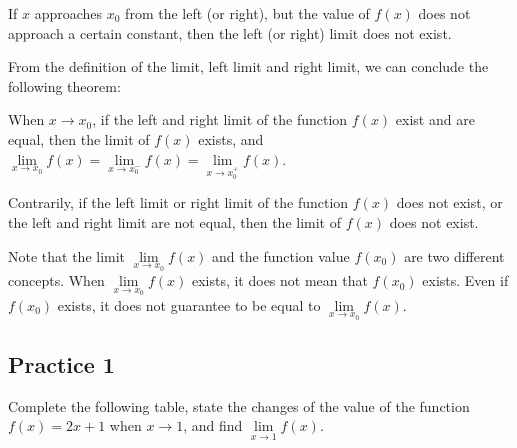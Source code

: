 \documentclass[12pt]{report}
\begin{document}
If $x$ approaches $x_0$ from the left (or right), but the value of $f (x)$ does
not approach a certain constant, then the left (or right) limit does not exist.

From the definition of the limit, left limit and right limit, we can conclude
the following theorem:
\begin{mdframed}[style=MyFrame]
    When $x \to x_0$, if the left and right limit of the function $f (x)$ exist and are equal, then the limit of $f (x)$ exists, and $\lim\limits_{x \to x_0} f (x) = \lim\limits_{x \to x_0^-} f (x) = \lim\limits_{x \to x_0^+} f (x)$.

    Contrarily, if the left limit or right limit of the function $f (x)$ does not
    exist, or the left and right limit are not equal, then the limit of $f (x)$
    does not exist.
\end{mdframed}

Note that the limit $\lim\limits_{x \to x_0} f (x)$ and the function value $f
    (x_0)$ are two different concepts. When $\lim\limits_{x \to x_0} f (x)$ exists,
it does not mean that $f (x_0)$ exists. Even if $f (x_0)$ exists, it does not
guarantee to be equal to $\lim\limits_{x \to x_0} f (x)$.

\newpage
\subsection{Practice 1}

Complete the following table, state the changes of the value of the function $f
    (x) = 2x + 1$ when $x \to 1$, and find $\lim\limits_{x \to 1} f (x)$.
\end{document}
